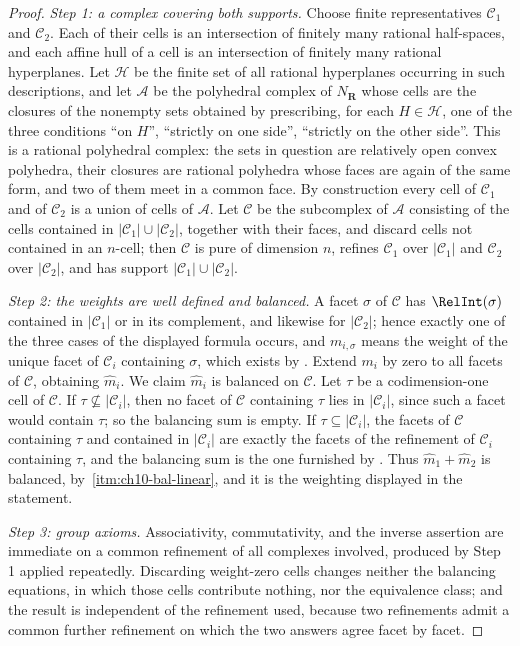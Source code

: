 \begin{proof}
\emph{Step 1: a complex covering both supports.}
Choose finite representatives $\mathscr C_1$ and $\mathscr C_2$.  Each of
their cells is an intersection of finitely many rational half-spaces, and
each affine hull of a cell is an intersection of finitely many rational
hyperplanes.  Let $\mathscr H$ be the finite set of all rational hyperplanes
occurring in such descriptions, and let $\mathscr A$ be the polyhedral
complex of $N_{\mathbf R}$ whose cells are the closures of the nonempty sets
obtained by prescribing, for each $H\in\mathscr H$, one of the three
conditions ``on $H$'', ``strictly on one side'', ``strictly on the other
side''.  This is a rational polyhedral complex: the sets in question are
relatively open convex polyhedra, their closures are rational polyhedra
whose faces are again of the same form, and two of them meet in a common
face.  By construction every cell of $\mathscr C_1$ and of $\mathscr C_2$ is
a union of cells of $\mathscr A$.  Let $\mathscr C$ be the subcomplex of
$\mathscr A$ consisting of the cells contained in
$|\mathscr C_1|\cup|\mathscr C_2|$, together with their faces, and discard
cells not contained in an $n$-cell; then $\mathscr C$ is pure of dimension
$n$, refines $\mathscr C_1$ over $|\mathscr C_1|$ and $\mathscr C_2$ over
$|\mathscr C_2|$, and has support $|\mathscr C_1|\cup|\mathscr C_2|$.

\emph{Step 2: the weights are well defined and balanced.}
A facet $\sigma$ of $\mathscr C$ has $\RelInt(\sigma)$ contained in
$|\mathscr C_1|$ or in its complement, and likewise for $|\mathscr C_2|$;
hence exactly one of the three cases of the displayed formula occurs, and
$m_{i,\sigma}$ means the weight of the unique facet of $\mathscr C_i$
containing $\sigma$, which exists by
.  Extend $m_i$ by zero to all facets of
$\mathscr C$, obtaining $\widehat m_i$.  We claim $\widehat m_i$ is balanced
on $\mathscr C$.  Let $\tau$ be a codimension-one cell of $\mathscr C$.  If
$\tau\not\subseteq|\mathscr C_i|$, then no facet of $\mathscr C$ containing
$\tau$ lies in $|\mathscr C_i|$, since such a facet would contain $\tau$;
so the balancing sum is empty.  If $\tau\subseteq|\mathscr C_i|$, the facets
of $\mathscr C$ containing $\tau$ and contained in $|\mathscr C_i|$ are
exactly the facets of the refinement of $\mathscr C_i$ containing $\tau$, and
the balancing sum is the one furnished by
.  Thus
$\widehat m_1+\widehat m_2$ is balanced, by
\,\cref{itm:ch10-bal-linear}, and it is
the weighting displayed in the statement.

\emph{Step 3: group axioms.}
Associativity, commutativity, and the inverse assertion are immediate on a
common refinement of all complexes involved, produced by Step 1 applied
repeatedly.  Discarding weight-zero cells changes neither the balancing
equations, in which those cells contribute nothing, nor the equivalence
class; and the result is independent of the refinement used, because two
refinements admit a common further refinement on which the two answers agree
facet by facet.
\end{proof}

